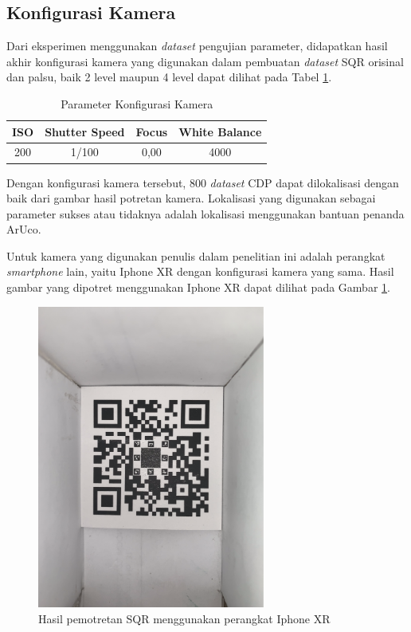 \subsection{Konfigurasi Kamera}
Dari eksperimen menggunakan \emph{dataset} pengujian parameter, didapatkan hasil akhir konfigurasi kamera yang digunakan dalam pembuatan \emph{dataset} SQR
orisinal dan palsu, baik 2 level maupun 4 level dapat dilihat pada Tabel \ref{Tab: 4-Parameter Konfigurasi Kamera}.

\begin{table}[!ht]
	\centering
	\caption{Parameter Konfigurasi Kamera}
	\vspace{0.5em}
	\begin{tabular}{|c|c|c|c|}
		\hline
		\textbf{ISO} & \textbf{Shutter Speed} & \textbf{Focus} & \textbf{White Balance} \\ \hline
		200          & 1/100                  & 0,00           & 4000                   \\ \hline
	\end{tabular}
	\label{Tab: 4-Parameter Konfigurasi Kamera}
\end{table}

\noindent Dengan konfigurasi kamera tersebut, 800 \emph{dataset} CDP dapat dilokalisasi dengan baik dari gambar hasil potretan kamera. Lokalisasi yang digunakan sebagai
parameter sukses atau tidaknya adalah lokalisasi menggunakan bantuan penanda ArUco.

Untuk kamera yang digunakan penulis dalam penelitian ini adalah perangkat \emph{smartphone} lain, yaitu Iphone XR dengan konfigurasi kamera yang sama. Hasil
gambar yang dipotret menggunakan Iphone XR dapat dilihat pada Gambar \ref{Fig: 4-hasilfotoiphonexr}.

\begin{figure}[h]
	\centering
	\includegraphics[width=7.5cm]{contents/chapter-4/4-hasilfotoiphonexr.png}
	\caption{Hasil pemotretan SQR menggunakan perangkat Iphone XR}
	\label{Fig: 4-hasilfotoiphonexr}
\end{figure}

